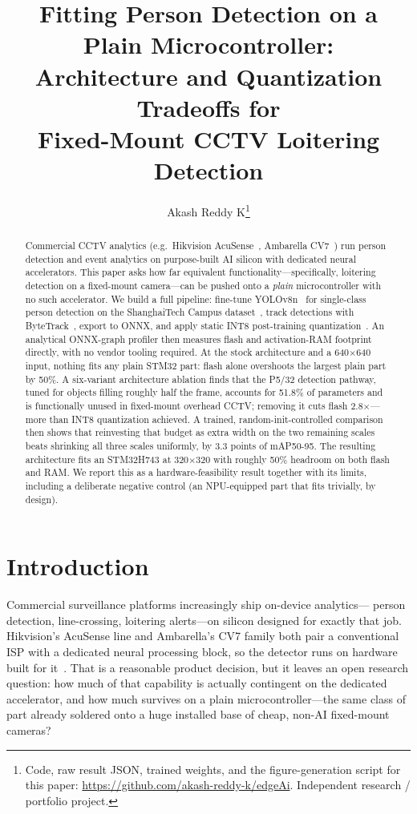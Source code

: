 \documentclass[11pt]{article}
\title{\textbf{Fitting Person Detection on a Plain Microcontroller:\\
Architecture and Quantization Tradeoffs for\\
Fixed-Mount CCTV Loitering Detection}}
\author{Akash Reddy K\thanks{Code, raw result JSON, trained weights, and the
figure-generation script for this paper:
\url{https://github.com/akash-reddy-k/edgeAi}. Independent research /
portfolio project.}}
\date{}
\begin{document}
\maketitle

\begin{abstract}
Commercial CCTV analytics (e.g.\ Hikvision AcuSense~\cite{hikvision_acusense},
Ambarella CV7~\cite{ambarella_cv7}) run person detection and event analytics
on purpose-built AI silicon with dedicated neural accelerators. This paper
asks how far equivalent functionality---specifically, loitering detection on
a fixed-mount camera---can be pushed onto a \emph{plain} microcontroller with
no such accelerator. We build a full pipeline: fine-tune YOLOv8n~\cite{yolov8}
for single-class person detection on the ShanghaiTech Campus
dataset~\cite{shanghaitech}, track detections with ByteTrack~\cite{bytetrack},
export to ONNX, and apply static INT8 post-training
quantization~\cite{onnx_quantization}. An analytical ONNX-graph profiler then
measures flash and activation-RAM footprint directly, with no vendor tooling
required. At the stock architecture and a 640$\times$640 input, nothing fits
any plain STM32 part: flash alone overshoots the largest plain part by 50\%.
A six-variant architecture ablation finds that the P5/32 detection pathway,
tuned for objects filling roughly half the frame, accounts for 51.8\% of
parameters and is functionally unused in fixed-mount overhead CCTV; removing
it cuts flash 2.8$\times$---more than INT8 quantization achieved. A trained,
random-init-controlled comparison then shows that reinvesting that budget as
extra width on the two remaining scales beats shrinking all three scales
uniformly, by 3.3 points of mAP50-95. The resulting architecture fits an
STM32H743 at 320$\times$320 with roughly 50\% headroom on both flash and RAM.
We report this as a hardware-feasibility result together with its limits,
including a deliberate negative control (an NPU-equipped part that fits
trivially, by design).
\end{abstract}

\section{Introduction}

Commercial surveillance platforms increasingly ship on-device analytics---
person detection, line-crossing, loitering alerts---on silicon designed for
exactly that job. Hikvision's AcuSense line and Ambarella's CV7 family both
pair a conventional ISP with a dedicated neural processing block, so the
detector runs on hardware built for it~\cite{hikvision_acusense,
ambarella_cv7}. That is a reasonable product decision, but it leaves an
open research question: how much of that capability is actually contingent
on the dedicated accelerator, and how much survives on a plain
microcontroller---the same class of part already soldered onto a huge
installed base of cheap, non-AI fixed-mount cameras?
\end{document}
